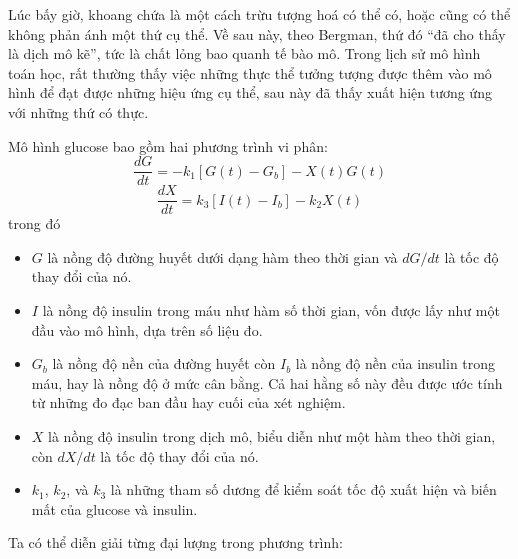 \documentclass[12pt]{book}
\theoremstyle{exercise}
\begin{document}
Lúc bấy giờ, khoang chứa là một cách trừu tượng hoá có thể có, hoặc cũng có thể không phản ánh một thứ cụ thể. Về sau này, theo Bergman, thứ đó ``đã cho thấy là dịch mô kẽ'', tức là chất lỏng bao quanh tế bào mô. Trong lịch sử mô hình toán học, rất thường thấy việc những thực thể tưởng tượng được thêm vào mô hình để đạt được những hiệu ứng cụ thể, sau này đã thấy xuất hiện tương ứng với những thứ có thực.


Mô hình glucose bao gồm hai phương trình vi phân:
%
\[ \frac{dG}{dt} = -k_1 \left[ G(t) - G_b \right] - X(t) G(t)  \]
%
\[ \frac{dX}{dt} = k_3 \left[I(t) - I_b \right] - k_2 X(t) \]
%
trong đó

\begin{itemize}

\item $G$ là nồng độ đường huyết dưới dạng hàm theo thời gian và $dG/dt$ là tốc độ thay đổi của nó.

\item $I$ là nồng độ insulin trong máu như hàm số thời gian, vốn được lấy như một đầu vào mô hình, dựa trên số liệu đo.

\item $G_b$ là nồng độ nền của đường huyết còn $I_b$ là nồng độ nền của insulin trong máu, hay là nồng độ ở mức cân bằng. Cả hai hằng số này đều được ước tính từ những đo đạc ban đầu hay cuối của xét nghiệm.

\item $X$ là nồng độ insulin trong dịch mô, biểu diễn như một hàm theo thời gian, còn $dX/dt$ là tốc độ thay đổi của nó.

\item $k_1$, $k_2$, và $k_3$ là những tham số dương để kiểm soát tốc độ xuất hiện và biến mất của glucose và insulin. 

\end{itemize}

Ta có thể diễn giải từng đại lượng trong phương trình:
\end{document}
